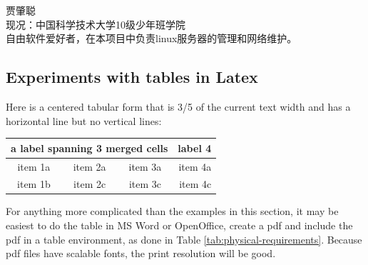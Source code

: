 \begin{framed}
\noindent
{贾肇聪\\
现况：中国科学技术大学10级少年班学院\\
}
自由软件爱好者，在本项目中负责linux服务器的管理和网络维护。
\end{framed}



\begin{remark} \color{blue}
\section*{Experiments with tables in Latex}

Here is a centered tabular form that is 3/5 of the current text width and has a horizontal line but no
vertical lines:

 \begin{center}  %
  \begin{tabular*}{0.6 \textwidth}%
     {@{\extracolsep{\fill}}cccr}
  \multicolumn{3}{c}{a label spanning 3 merged cells} & label 4  \\
  \hline  %
  item 1a  & item 2a  & item 3a  & item 4a  \\
  item 1b  & item 2c  & item 3c  & item 4c  \\
  \end{tabular*}
  \end{center}

\noindent For anything more complicated than the examples in this section, it may be easiest to do the table in MS Word or OpenOffice, create a pdf and include the pdf in a table environment, as done in Table \ref{tab:physical-requirements}. Because pdf files have scalable fonts, the print resolution will be good.

\end{remark}\normalcolor

